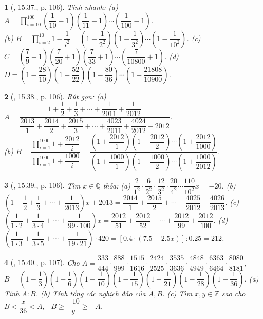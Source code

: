 \documentclass{article}
\newtheorem{baitoan}{}
\begin{document}
\begin{baitoan}[\cite{TLCT_THCS_Toan_6_so_hoc}, 15.37., p. 106]
	Tính nhanh: (a) $A = \prod_{i=10}^{100} \left(\dfrac{1}{10} - 1\right)\left(\dfrac{1}{11} - 1\right)\cdots\left(\dfrac{1}{100} - 1\right)$.\\(b) $B = \prod_{i=2}^{10} 1 - \dfrac{1}{i^2} = \left(1 - \dfrac{1}{2^2}\right)\left(1 - \dfrac{1}{3^2}\right)\cdots\left(1 - \dfrac{1}{10^2}\right)$. (c) $C = \left(\dfrac{7}{9} + 1\right)\left(\dfrac{7}{20} + 1\right)\left(\dfrac{7}{33} + 1\right)\cdots\left(\dfrac{7}{10800} + 1\right)$. (d) $D = \left(1 - \dfrac{28}{10}\right)\left(1 - \dfrac{52}{22}\right)\left(1 - \dfrac{80}{36}\right)\cdots\left(1 - \dfrac{21808}{10900}\right)$.
\end{baitoan}

\begin{baitoan}[\cite{TLCT_THCS_Toan_6_so_hoc}, 15.38., p. 106]
	Rút gọn: (a) $A = \dfrac{1 + \dfrac{1}{2} + \dfrac{1}{3} + \cdots + \dfrac{1}{2011} + \dfrac{1}{2012}}{\dfrac{2013}{1} + \dfrac{2014}{2} + \dfrac{2015}{3} + \cdots + \dfrac{4023}{2011} + \dfrac{4024}{2012} - 2012}$.\\(b) $B = \dfrac{\prod_{i=1}^{1000} 1 + \dfrac{2012}{i}}{\prod_{i=1}^{1000} 1 + \dfrac{1000}{i}} = \dfrac{\left(1 + \dfrac{2012}{1}\right)\left(1 + \dfrac{2012}{2}\right)\cdots\left(1 + \dfrac{2012}{1000}\right)}{\left(1 + \dfrac{1000}{1}\right)\left(1 + \dfrac{1000}{2}\right)\cdots\left(1 + \dfrac{1000}{2012}\right)}$.
\end{baitoan}

\begin{baitoan}[\cite{TLCT_THCS_Toan_6_so_hoc}, 15.39., p. 106]
	Tìm $x\in\mathbb{Q}$ thỏa: (a) $\dfrac{2}{1^2}\cdot\dfrac{6}{2^2}\cdot\dfrac{12}{3^2}\cdot\dfrac{20}{4^2}\cdots\dfrac{110}{10^2}x = -20$. (b) $\left(1 + \dfrac{1}{2} + \dfrac{1}{3} + \cdots + \dfrac{1}{2013}\right)x + 2013 = \dfrac{2014}{1} + \dfrac{2015}{2} + \cdots + \dfrac{4025}{2012} + \dfrac{4026}{2013}$. (c) $\left(\dfrac{1}{1\cdot2} + \dfrac{1}{3\cdot4} + \cdots + \dfrac{1}{99\cdot100}\right)x = \dfrac{2012}{51} + \dfrac{2012}{52} + \cdots + \dfrac{2012}{99} + \dfrac{2012}{100}$. (d) $\left(\dfrac{1}{1\cdot3} + \dfrac{1}{3\cdot5} + \cdots + \dfrac{1}{19\cdot21}\right)\cdot420 = [0.4\cdot(7.5 - 2.5x)]:0.25 = 212$.
\end{baitoan}

\begin{baitoan}[\cite{TLCT_THCS_Toan_6_so_hoc}, 15.40., p. 107]
	Cho $A = \dfrac{333}{444}\cdot\dfrac{888}{999}\cdot\dfrac{1515}{1616}\cdot\dfrac{2424}{2525}\cdot\dfrac{3535}{3636}\cdot\dfrac{4848}{4949}\cdot\dfrac{6363}{6464}\cdot\dfrac{8080}{8181}$,\\$B = \left(1 - \dfrac{1}{3}\right)\left(1 - \dfrac{1}{6}\right)\left(1 - \dfrac{1}{10}\right)\left(1 - \dfrac{1}{15}\right)\left(1 - \dfrac{1}{21}\right)\left(1 - \dfrac{1}{28}\right)\left(1 - \dfrac{1}{36}\right)$. (a) Tính $A:B$. (b) Tính tổng các nghịch đảo của $A,B$. (c) Tìm $x,y\in\mathbb{Z}$ sao cho $B < \dfrac{x}{36} < A,-B\ge\dfrac{-10}{y}\ge-A$.
\end{baitoan}
\end{document}
